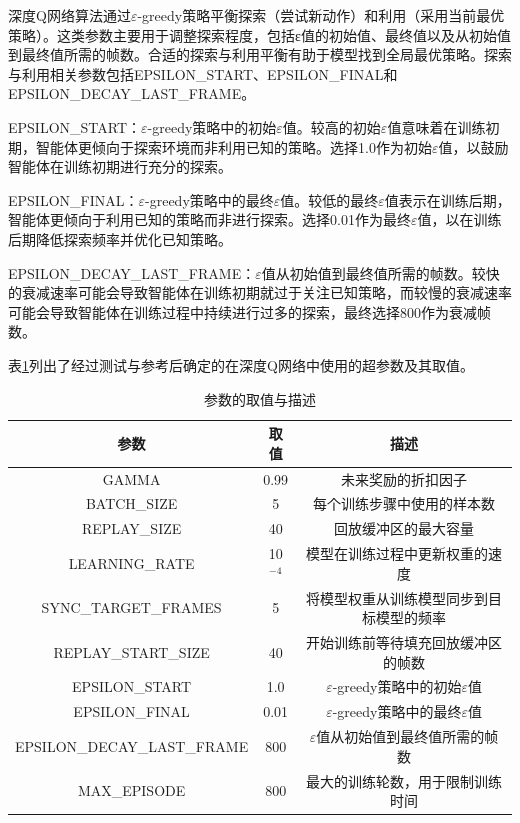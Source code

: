 深度Q网络算法通过$\varepsilon$-greedy策略平衡探索（尝试新动作）和利用（采用当前最优策略）。这类参数主要用于调整探索程度，包括ε值的初始值、最终值以及从初始值到最终值所需的帧数。合适的探索与利用平衡有助于模型找到全局最优策略。探索与利用相关参数包括EPSILON\_START、EPSILON\_FINAL和EPSILON\_DECAY\_LAST\_FRAME。

EPSILON\_START：$\varepsilon$-greedy策略中的初始$\varepsilon$值。较高的初始$\varepsilon$值意味着在训练初期，智能体更倾向于探索环境而非利用已知的策略。选择1.0作为初始$\varepsilon$值，以鼓励智能体在训练初期进行充分的探索。

EPSILON\_FINAL：$\varepsilon$-greedy策略中的最终$\varepsilon$值。较低的最终$\varepsilon$值表示在训练后期，智能体更倾向于利用已知的策略而非进行探索。选择0.01作为最终$\varepsilon$值，以在训练后期降低探索频率并优化已知策略。

EPSILON\_DECAY\_LAST\_FRAME：$\varepsilon$值从初始值到最终值所需的帧数。较快的衰减速率可能会导致智能体在训练初期就过于关注已知策略，而较慢的衰减速率可能会导致智能体在训练过程中持续进行过多的探索，最终选择800作为衰减帧数。

表\ref{demand_inf}列出了经过测试与参考后确定的在深度Q网络中使用的超参数及其取值。
\renewcommand{\arraystretch}{1.2} %
\begin{table}[htbp]
\centering
\caption{参数的取值与描述}
\label{demand_inf}
\begin{tabular}{ccc}
\toprule
参数 & 取值 & 描述       \\
\midrule
GAMMA & 0.99 & 未来奖励的折扣因子 \\ 
BATCH\_SIZE & 5 & 每个训练步骤中使用的样本数 \\ 
REPLAY\_SIZE & 40 & 回放缓冲区的最大容量 \\ 
LEARNING\_RATE & 10$^{-4}$ & 模型在训练过程中更新权重的速度 \\ 
SYNC\_TARGET\_FRAMES & 5 & 将模型权重从训练模型同步到目标模型的频率 \\ 
REPLAY\_START\_SIZE & 40 & 开始训练前等待填充回放缓冲区的帧数 \\ 
EPSILON\_START & 1.0 & $\varepsilon$-greedy策略中的初始$\varepsilon$值 \\ 
EPSILON\_FINAL & 0.01 & $\varepsilon$-greedy策略中的最终$\varepsilon$值 \\ 
EPSILON\_DECAY\_LAST\_FRAME & 800 & $\varepsilon$值从初始值到最终值所需的帧数 \\ 
MAX\_EPISODE & 800 & 最大的训练轮数，用于限制训练时间 \\ 

\bottomrule
\end{tabular}
\end{table}



